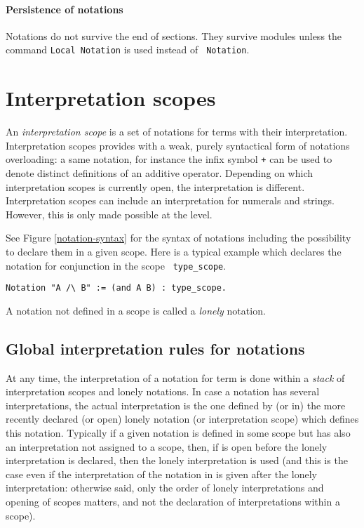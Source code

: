 \paragraph{Persistence of notations}

Notations do not survive the end of sections. They survive modules
unless the command {\tt Local Notation} is used instead of {\tt
Notation}.

\section[Interpretation scopes]{Interpretation scopes
\label{scopes}}

An {\em interpretation scope} is a set of notations for terms with
their interpretation. Interpretation scopes provides with a weak,
purely syntactical form of notations overloading: a same notation, for
instance the infix symbol \verb=+= can be used to denote distinct
definitions of an additive operator. Depending on which interpretation
scopes is currently open, the interpretation is different.
Interpretation scopes can include an interpretation for
numerals and strings. However, this is only made possible at the
{\ocaml} level.

See Figure \ref{notation-syntax} for the syntax of notations including
the possibility to declare them in a given scope.  Here is a typical
example which declares the notation for conjunction in the scope {\tt
type\_scope}.

\begin{verbatim}
Notation "A /\ B" := (and A B) : type_scope.
\end{verbatim}

\Rem A notation not defined in a scope is called a {\em lonely} notation.

\subsection{Global interpretation rules for notations}

At any time, the interpretation of a notation for term is done within
a {\em stack} of interpretation scopes and lonely notations. In case a
notation has several interpretations, the actual interpretation is the
one defined by (or in) the more recently declared (or open) lonely
notation (or interpretation scope) which defines this notation.
Typically if a given notation is defined in some scope {\scope} but
has also an interpretation not assigned to a scope, then, if {\scope}
is open before the lonely interpretation is declared, then the lonely
interpretation is used (and this is the case even if the
interpretation of the notation in {\scope} is given after the lonely
interpretation: otherwise said, only the order of lonely
interpretations and opening of scopes matters, and not the declaration
of interpretations within a scope).

